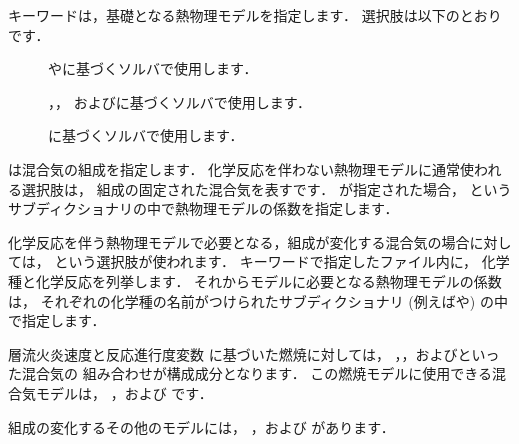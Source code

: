 キーワードは，基礎となる熱物理モデルを指定します．
選択肢は以下のとおりです．
\begin{description}
 \item[]
            やに基づくソルバで使用します．
 \item[]
            ，，
            およびに基づくソルバで使用します．
 \item[]
            に基づくソルバで使用します．
\end{description}

は混合気の組成を指定します．
化学反応を伴わない熱物理モデルに通常使われる選択肢は，
組成の固定された混合気を表すです．
が指定された場合，
というサブディクショナリの中で熱物理モデルの係数を指定します．

化学反応を伴う熱物理モデルで必要となる，組成が変化する混合気の場合に対しては，
という選択肢が使われます．
キーワードで指定したファイル内に，
化学種と化学反応を列挙します．
それからモデルに必要となる熱物理モデルの係数は，
それぞれの化学種の名前がつけられたサブディクショナリ (例えばや)
の中で指定します．

層流火炎速度と反応進行度変数
%
に基づいた燃焼に対しては，
，，およびといった混合気の
組み合わせが構成成分となります．
この燃焼モデルに使用できる混合気モデルは，
，および
です．

組成の変化するその他のモデルには，
，および
があります．


